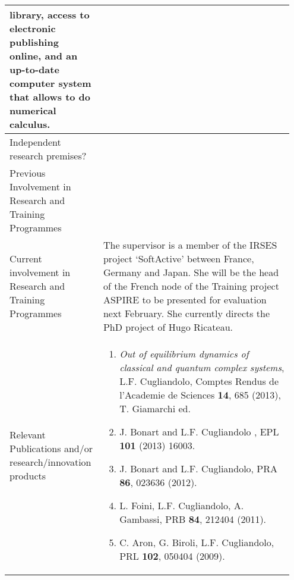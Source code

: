 \documentclass[a4paper,11pt]{article}
\begin{document}
\begin{center}
{\begin{tabular}{|p{0.3\linewidth}|p{0.65\linewidth}|}
library, access to electronic publishing online, and an up-to-date computer system 
that allows to do numerical calculus.\\
      \hline
      Independent research premises? &\\
      \hline
      Previous Involvement in Research and Training Programmes &\\
      \hline
      Current involvement in Research and Training Programmes & The supervisor is a member of the IRSES project `SoftActive'
between France, Germany and Japan. She will be the head of the French 
node of the Training project ASPIRE to be presented for evaluation next February.
She currently directs the PhD project of Hugo Ricateau.\\
      \hline
      Relevant Publications and/or research/innovation products &\begin{enumerate}
 \item 
 \textit{Out of equilibrium dynamics of classical and quantum complex systems}, 
L.F. Cugliandolo,  Comptes Rendus de l'Academie de Sciences {\bf 14}, 685 (2013), T. Giamarchi ed. 
\item
J. Bonart and L.F. Cugliandolo ,  EPL {\bf 101} (2013) 16003.
\item
 J. Bonart and L.F. Cugliandolo, PRA {\bf 86}, 023636 (2012).
\item
 L. Foini, L.F. Cugliandolo, A. Gambassi, PRB {\bf 84}, 212404 (2011).
\item
C. Aron, G. Biroli, L.F. Cugliandolo, PRL {\bf 102}, 050404 (2009).
\end{enumerate}
     \\
      \hline
    \end{tabular}
    
    \medskip

  }
\end{center}
\end{document}

